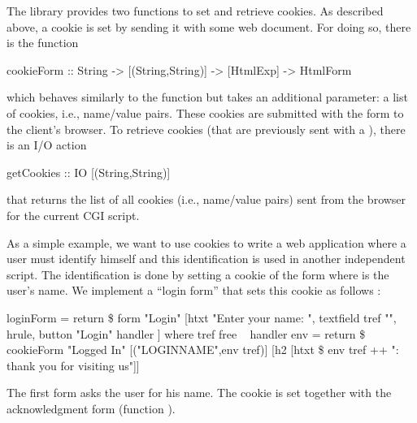The  library provides two functions to set
and retrieve cookies.
As described above, a cookie is set by sending it with some
web document. For doing so, there is the function
\begin{prog}
cookieForm :: String -> [(String,String)] -> [HtmlExp] -> HtmlForm
\end{prog}
which behaves similarly to the function  but
takes an additional parameter: a list of cookies, i.e.,
name/value pairs. These cookies are submitted with the form
to the client's browser. To retrieve cookies (that are previously sent
with a ), there is an I/O action
\begin{prog}
getCookies :: IO [(String,String)]
\end{prog}
that returns the list of all cookies (i.e., name/value pairs)
sent from the browser for the current CGI script.

As a simple example, we want to use cookies to write a web application
where a user must identify himself and this identification is used
in another independent script. The identification is done
by setting a cookie of the form 
where  is the user's name.
We implement a ``login form'' that sets this cookie as follows
:
\begin{prog}
loginForm = return \$ form "Login"
      [htxt "Enter your name: ", textfield tref "", hrule,
       button "Login" handler
      ]
 where
   tref free
~
   handler env =
     return \$ cookieForm "Logged In" [("LOGINNAME",env tref)]
                       [h2 [htxt \$ env tref ++ ": thank you for visiting us"]]
\end{prog}
The first form asks the user for his name.
The cookie is set together with the acknowledgment form
(function ).


